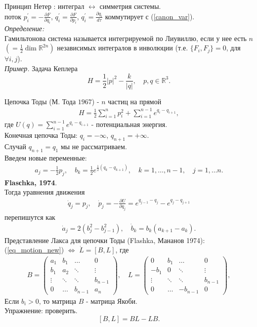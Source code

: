 \documentclass[a4paper,12pt]{article}
\theoremstyle{definition}
\theoremstyle{definition}
\theoremstyle{definition}
\newcommand{\bear}[1]{\begin{eqnarray}\label{#1}}
\newcommand{\ear}{\end{eqnarray}}
\newcommand{\R}{ {\mathbb R} }
\begin{document}
Принцип Нетер : интеграл $\leftrightarrow$  симметрия системы.\\
поток $p^{'}_{i} = -\displaystyle\frac{\partial F}{\partial q_{i}}$, $q^{'}_{i} = \displaystyle\frac{\partial F}{\partial p_{i}}$, $q^{'}_{i} = \displaystyle\frac{\partial q_{i}}{d \tau}$ коммутирует с (\ref{canon_var}).\\


\textit{Определение:}\\
Гамильтонова система называется интегрируемой по Лиувиллю, если у нее есть $n$ $\left( = \frac 12 \dim \R^{2n} \right)$ независимых интегралов в инволюции (т.е. $\{F_{i}, F_{j}\} =0$, для $\forall i,j$).\\


\textit{Пример.} Задача Кеплера
\[H = \frac12 |p|^{2} - \frac{k}{|q|},\quad p,q \in \R^{3}.\]

Цепочка Тоды (М. Тода $1967$) -  $n$ частиц на прямой
\bear{Toda_ham}
H = \frac12 \sum^{n}_{i=1}p^{2}_{i} + \sum^{n-1}_{i=1}e^{q_{i} - q_{i+1}},
\ear
где $U(q) = \displaystyle{\sum^{n-1}_{i=1}e^{q_{i} - q_{i+1}}}$ - потенциальная энергия.\\
Конечная цепочка Тоды: $q_{i} = -\infty$, $q_{n+1} = +\infty$.\\
Случай $q_{n+1} = q_{1}$ мы не рассматриваем.\\


Введем новые переменные:
\bear{Flaschka_var}
a_{j} = -\frac12 p_{j},\quad b_{k} = \frac12 e^{\frac 12 (q_{k} - q_{k+1})}, \quad k = 1,\ldots,n-1,\quad j = 1,\ldots n.
\ear \textbf{Flasсhka, 1974}.\\
Тогда уравнения движения
\bear{eq_motion}
\dot{q}_{j} =  p_{j}, \quad \dot{p}_{j} = -\frac{\partial U}{\partial q_{j}} = e^{q_{j-1} - q_{j}} - e^{q_{j} - q_{j+1}}
\ear
перепишутся как
\bear{eq_motion_new}
\dot{a}_{j} = 2(b^{2}_{j} - b^{2}_{j-1}), \quad \dot{b}_{k} = b_{k}(a_{k+1} - a_{k}).
\ear
Представление Лакса для цепочки Тоды (Flashka, Мананов 1974):\\
(\ref{eq_motion_new}) $\Longleftrightarrow$ $\dot{L} = [B, L]$, где
\bear{matrices}
B =
\left( \begin{array}{cccc}
a_{1}& b_{1} &\ldots & 0\\
b_{1}& a_{2} &\ddots & \vdots\\
\vdots & \ddots &\ddots & b_{n-1}\\
0& \ldots & b_{n-1}  & a_{n}
\end{array}
\right), \quad
L =
\left( \begin{array}{cccc}
0 & b_{1} &\ldots & 0\\
- b_{1} & 0 &\ddots & \vdots\\
\vdots & \ddots &\ddots & b_{n-1}\\
0 & \ldots & -b_{n-1}  & 0
\end{array}
\right),
\ear
Если $b_{i}>0 $, то матрица $B$ - матрица Якоби.\\
Упражнение: проверить.
\[[B,L] = BL - LB.\]
\end{document}
